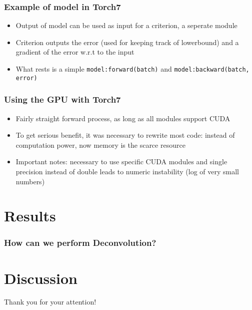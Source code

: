 \documentclass{beamer}
\begin{document}
\begin{frame}
\frametitle{Example of model in Torch7}

\begin{itemize}
	\item Output of model can be used as input for a criterion, a seperate module
	\item Criterion outputs the error (used for keeping track of lowerbound) and a gradient of the error w.r.t to the input
	\item What rests is a simple \texttt{model:forward(batch)} and \texttt{model:backward(batch, error)}
\end{itemize}

\end{frame}

\begin{frame}
\frametitle{Using the GPU with Torch7}

\begin{itemize}
	\item Fairly straight forward process, as long as all modules support CUDA
	\item To get serious benefit, it was necessary to rewrite most code: instead of computation power, now memory is the scarce resource
	\item Important notes: necessary to use specific CUDA modules and single precision instead of double leads to numeric instability (log of very small numbers)
\end{itemize}

\end{frame}

 
\section{Results}

\begin{frame}
\frametitle{How can we perform Deconvolution?}
\end{frame}

\section{Discussion}


%	
%	


\begin{frame}
\Huge{\centerline{Thank you for your attention!}}
\end{frame}

\end{document}
